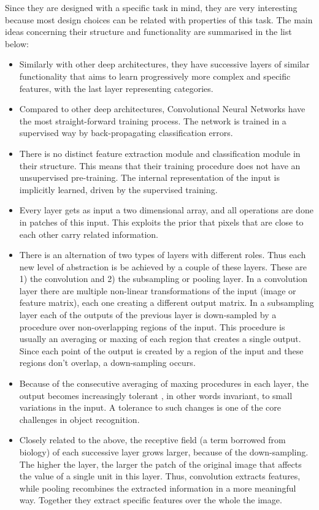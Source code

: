 \documentclass[a4paper]{article}
\begin{document}
		Since they are designed with a specific task in mind, they are very interesting because most design choices can be related with properties of this task. The main ideas concerning their structure and functionality are summarised in the list below:
			\begin{itemize}
			\item Similarly with other deep architectures, they have successive layers of similar functionality that aims to learn progressively more complex and specific features, with the last layer representing categories. 
			\item Compared to other deep architectures, Convolutional Neural Networks have the most straight-forward training process. The network is trained in a supervised way by back-propagating classification errors.
			\item There is no distinct feature extraction module and classification module in their structure. This means that their training procedure does not have an unsupervised pre-training. The internal representation of the input is implicitly learned, driven by the supervised training.
			\item Every layer gets as input a two dimensional array, and all operations are done in patches of this input. This exploits the prior that pixels that are close to each other carry related information.
			\item There is an alternation of two types of layers with different roles. Thus each new level of abstraction is be achieved by a couple of these layers. These are 1) the convolution and 2) the subsampling or pooling layer. In a convolution layer there are multiple non-linear transformations of the input (image or feature matrix), each one creating a different output matrix. In a subsampling layer each of the outputs of the previous layer is down-sampled  by a procedure over non-overlapping regions of the input. This procedure is usually an averaging or maxing of each region that creates a single output. Since each point of the output is created by a region of the input and these regions don't overlap, a down-sampling occurs.
			\item Because of the consecutive averaging of maxing procedures in each layer, the output becomes increasingly tolerant , in other words invariant, to small variations in the input. A tolerance to such changes is one of the core challenges in object recognition.
			\item Closely related to the above, the receptive field (a term borrowed from biology) of each successive layer grows larger, because of the down-sampling. The higher the layer, the larger the patch of the original image that affects the value of a single unit in this layer.  Thus, convolution extracts features, while pooling recombines the extracted information in a more meaningful way. Together they extract specific features over the whole the image.

\end{itemize}
\end{document}
